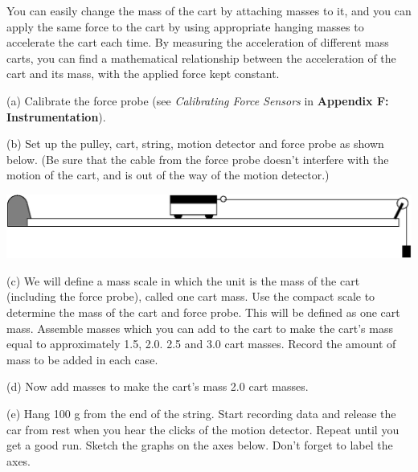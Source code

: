 You can easily change the mass of the cart by attaching masses to it, and you
can apply the same force to the cart by using appropriate hanging masses to
accelerate the cart each time. By measuring the acceleration of different mass
carts, you can find a mathematical relationship between the acceleration of
the cart and its mass, with the applied force kept constant.

(a) Calibrate the force probe (see \textit{Calibrating Force Sensors} in \textbf{Appendix F: Instrumentation}).

(b) Set up the pulley, cart, string, motion detector and force probe as shown
below. (Be sure that the cable from the force probe doesn't interfere with the
motion of the cart, and is out of the way of the motion detector.)

\vspace{0.3cm}
{\par\centering \includegraphics{force1/force1_fig4.eps} \par}
\vspace{0.3cm}

(c) We will define a mass scale in which the unit is the mass of the cart (including the force probe), called one cart mass. Use the compact scale to determine the mass of the cart and force probe. This will be defined as one cart mass. Assemble masses which you can add to the cart to make the cart's mass equal to approximately 1.5, 2.0. 2.5 and 3.0 cart masses. Record the amount of mass to be added in each case.

(d) Now add masses to make the cart's mass 2.0 cart masses.

(e) Hang 100 g from the end of the string.
Start recording data and release the car from rest when you hear the clicks
of the motion detector. Repeat until you get a good run. Sketch the graphs on
the axes below. Don't forget to label the axes.

